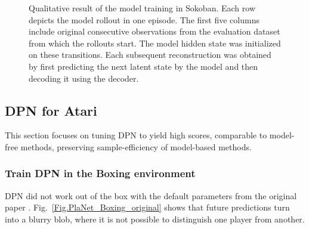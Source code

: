 \begin{figure}[H]
\caption[Qualitative result of the PlaNet model training in Sokoban]{Qualitative result of the model training in Sokoban. Each row depicts the model rollout in one episode. The first five columns include original consecutive observations from the evaluation dataset from which the rollouts start. The model hidden state was initialized on these transitions. Each subsequent reconstruction was obtained by first predicting the next latent state by the model and then decoding it using the decoder.}
\label{Fig.PlaNet_Sokoban_openloop}
\end{figure}

\subsection{DPN for Atari}

This section focuses on tuning DPN to yield high scores, comparable to model-free methods, preserving sample-efficiency of model-based methods.

\subsubsection{Train DPN in the Boxing environment}

DPN did not work out of the box with the default parameters from the original paper \cite{Algo.PlaNet}. Fig.~\ref{Fig.PlaNet_Boxing_original} shows that future predictions turn into a blurry blob, where it is not possible to distinguish one player from another.

